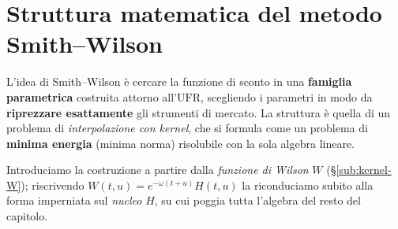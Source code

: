 \documentclass[11pt,a4paper]{article}
\theoremstyle{plain}
\theoremstyle{definition}
\theoremstyle{remark}
\newcommand{\UFR}{\ensuremath{\mathrm{UFR}}}
\begin{document}
\section{Struttura matematica del metodo Smith--Wilson}
\label{sec:sw-metodo}

L'idea di Smith--Wilson \`e cercare la funzione di sconto in una \textbf{famiglia
parametrica} costruita attorno all'$\UFR$, scegliendo i parametri in modo da
\textbf{riprezzare esattamente} gli strumenti di mercato. La struttura \`e quella di un
problema di \emph{interpolazione con kernel}, che si formula come un problema di
\textbf{minima energia} (minima norma) risolubile con la sola algebra lineare.

Introduciamo la costruzione a partire dalla \emph{funzione di Wilson} $W$
(§\ref{sub:kernel-W}); riscrivendo $W(t,u)=e^{-\omega(t+u)}H(t,u)$ la riconduciamo subito alla
forma imperniata sul \emph{nucleo} $H$, su cui poggia tutta l'algebra del resto del capitolo.
\end{document}
